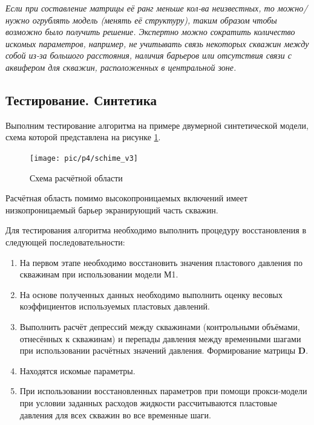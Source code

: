 \documentclass[14pt]{article}
\begin{document}
\textit{Если при составление матрицы её ранг меньше кол-ва неизвестных, то  можно/нужно огрублять модель (менять её структуру), таким образом чтобы возможно было получить решение. Экспертно можно сократить количество искомых параметров, например, не учитывать связь некоторых скважин между собой из-за большого расстояния, наличия барьеров или отсутствия связи с аквифером для скважин, расположенных в центральной зоне.}


\subsection{Тестирование. Синтетика}
Выполним тестирование алгоритма на примере двумерной синтетической модели, схема которой представлена на  рисунке \ref{fig:map_kp_v2}. 
\begin{figure}
	\centering
	\texttt{[image: pic/p4/schime\_v3]}
	\caption{Схема расчётной области}
	\label{fig:map_kp_v2}
\end{figure}
Расчётная область помимо высокопроницаемых включений имеет низкопроницаемый барьер экранирующий часть скважин.

Для тестирования алгоритма необходимо выполнить процедуру восстановления в следующей последовательности:
\begin{enumerate}
	\item На первом этапе необходимо восстановить значения пластового давления по скважинам при использовании модели М1.
	\item На основе полученных данных необходимо выполнить оценку весовых коэффициентов используемых пластовых давлений.
	\item Выполнить расчёт депрессий между скважинами (контрольными объёмами, отнесённых к скважинам) и перепады давления между временными шагами при использовании расчётных значений давления. Формирование матрицы $\boldsymbol{D}$.
	\item Находятся искомые параметры.
	\item При использовании восстановленных параметров при помощи прокси-модели при условии заданных расходов жидкости рассчитываются пластовые давления для всех скважин во все временные шаги.
\end{enumerate}
\end{document}
